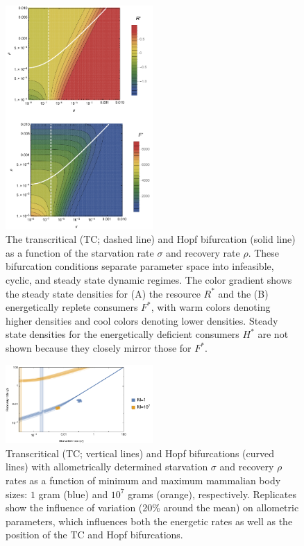 \documentclass{pnastwo}
\begin{document}
\begin{figure}
\centering
\includegraphics[width=0.5\textwidth]{fig_FixedPoint.pdf}
\caption{
The transcritical (TC; dashed line) and Hopf bifurcation (solid line) as a function of the starvation rate $\sigma$ and recovery rate $\rho$.
These bifurcation conditions separate parameter space into infeasible, cyclic, and steady state dynamic regimes.
The color gradient shows the steady state densities for (A) the resource $R^*$ and the (B) energetically replete consumers $F^*$, with warm colors denoting higher densities and cool colors denoting lower densities.
Steady state densities for the energetically deficient consumers $H^*$ are not shown because they closely mirror those for $F^*$.
}
\label{fig:fp}
\end{figure}

\begin{figure}
\centering
\includegraphics[width=0.5\textwidth]{fig_DataHopf.pdf}
\caption{
Transcritical (TC; vertical lines) and Hopf bifurcations (curved lines) with allometrically determined starvation $\sigma$ and recovery $\rho$ rates as a function of minimum and maximum mammalian body sizes: $1$ gram (blue) and $10^7$ grams (orange), respectively.
Replicates show the influence of variation (20\% around the mean) on allometric parameters, which influences both the energetic rates as well as the position of the TC and Hopf bifurcations.
}
\label{fig:hopf}
\end{figure}
\end{document}
